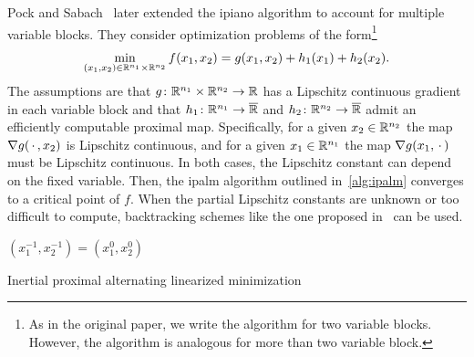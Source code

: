 Pock and Sabach~\cite{pock_inertial_2016} later extended the \gls{ipiano} algorithm to account for multiple variable blocks.
They consider optimization problems of the form\footnote{%
	As in the original paper, we write the algorithm for two variable blocks.
	However, the algorithm is analogous for more than two variable block.
}
\begin{equation}
	\min_{(x_{\num{1}}, x_{\num{2}}) \in \mathbb{R}^{n_{\num{1}}} \times \mathbb{R}^{n_{\num{2}}}} f(x_{\num{1}}, x_{\num{2}}) = g(x_{\num{1}}, x_{\num{2}}) + h_{\num{1}}(x_{\num{1}}) + h_{\num{2}}(x_{\num{2}}).
\end{equation}
The assumptions are that \( g \colon \mathbb{R}^{n_{\num{1}}} \times \mathbb{R}^{n_{\num{2}}} \to \mathbb{R} \) has a Lipschitz continuous gradient in each variable block and that \( h_{\num{1}} \colon \mathbb{R}^{n_{\num{1}}} \to \overline{\mathbb{R}} \) and \( h_{\num{2}} \colon \mathbb{R}^{n_{\num{2}}} \to \overline{\mathbb{R}} \) admit an efficiently computable proximal map.
Specifically, for a given \( x_{\num{2}} \in \mathbb{R}^{n_{\num{2}}} \) the map \( \nabla g(\,\cdot\,, x_{\num{2}}) \) is Lipschitz continuous, and for a given \( x_{\num{1}} \in \mathbb{R}^{n_{\num{1}}} \) the map \( \nabla g(x_{\num{1}}, \,\cdot\,) \) must be Lipschitz continuous.
In both cases, the Lipschitz constant can depend on the fixed variable.
Then, the \gls{ipalm} algorithm outlined in~\cref{alg:ipalm} converges to a critical point of \( f \).
When the partial Lipschitz constants are unknown or too difficult to compute, backtracking schemes like the one proposed in~\cite{beck_fista_2009} can be used.
\begin{algorithm}
	\DontPrintSemicolon
	\( (x_{\num{1}}^{\num{-1}}, x_{\num{2}}^{\num{-1}}) = (x_{\num{1}}^{\num{0}}, x_{\num{2}}^{\num{0}}) \)\;
	\caption{Inertial proximal alternating linearized minimization~\cite{pock_inertial_2016}}
	\label{alg:ipalm}
\end{algorithm}

